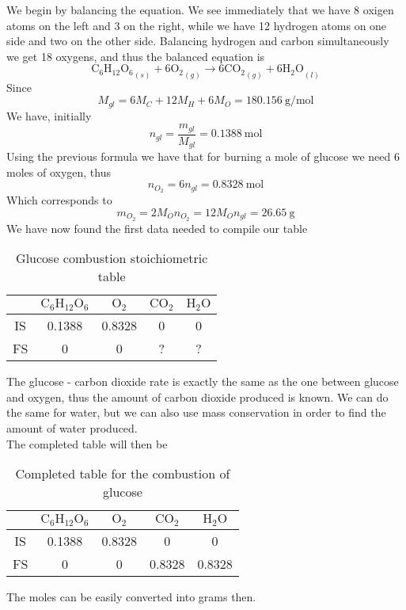 \documentclass[../qm.tex]{subfiles}
\begin{document}
\begin{sol}
	We begin by balancing the equation. We see immediately that we have 8 oxigen atoms on the left and 3 on the right, while we have 12 hydrogen atoms on one side and two on the other side. Balancing hydrogen and carbon simultaneously we get 18 oxygens, and thus the balanced equation is
	\begin{equation*}
		\mathrm{C_6H_{12}O_6}_{(s)}+6\mathrm{O_2}_{(g)}\to6\mathrm{CO_2}_{(g)}+6\mathrm{H_2O}_{(l)}
	\end{equation*}
	Since
	\begin{equation*}
		M_{gl}=6M_C+12M_H+6M_O=180.156\ \mathrm{g/mol}
	\end{equation*}
	We have, initially
	\begin{equation*}
		n_{gl}=\frac{m_{gl}}{M_{gl}}=0.1388\ \mathrm{mol}
	\end{equation*}
	Using the previous formula we have that for burning a mole of glucose we need 6 moles of oxygen, thus
	\begin{equation*}
		n_{O_2}=6n_{gl}=0.8328\ \mathrm{mol}
	\end{equation*}
	Which corresponds to 
	\begin{equation}[H]
		m_{O_2}=2M_{O}n_{O_2}=12M_{O}n_{gl}=26.65\ \mathrm{g}
		\label{eq:glucoseexsol.chexe}
	\end{equation}
	We have now found the first data needed to compile our table
	\begin{table}
		\centering
		\begin{tabular}{c|c|c|c|c|}
			&$\mathrm{C_6H_{12}O_6}$&$\mathrm{O_2}$&$\mathrm{CO_2}$&$\mathrm{H_2O}$\\\hline
			IS&0.1388&0.8328&0&0\\\hline
			FS&0&0&?&?\\\hline
		\end{tabular}
		\caption{Glucose combustion stoichiometric table}
		\label{tab:gburn.chexe}
	\end{table}
	The glucose - carbon dioxide rate is exactly the same as the one between glucose and oxygen, thus the amount of carbon dioxide produced is known. We can do the same for water, but we can also use mass conservation in order to find the amount of water produced.\\
	The completed table will then be
	\begin{table}[H]
		\centering
		\begin{tabular}{c|c|c|c|c|}
			&$\mathrm{C_6H_{12}O_6}$&$\mathrm{O_2}$&$\mathrm{CO_2}$&$\mathrm{H_2O}$\\\hline
			IS&0.1388&0.8328&0&0\\\hline
			FS&0&0&0.8328&0.8328\\\hline
		\end{tabular}
		\caption{Completed table for the combustion of glucose}
		\label{tab:gburncomp.chexe}
	\end{table}
	The moles can be easily converted into grams then.
\end{sol}
\end{document}
